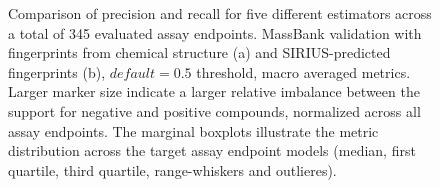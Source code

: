 \begin{figure}[h]
\begin{subfigure}[b]{0.495\textwidth}
      \caption{}
      \label{fig:hitcall_classification_Feature_Selection_XGBClassifier_mb_val_sirius_default_macro_avg}
  \end{subfigure}
  \caption{Comparison of precision and recall for five different estimators across a total of 345 evaluated assay endpoints. MassBank validation with fingerprints from chemical structure (a) and SIRIUS-predicted fingerprints (b), $default = 0.5$ threshold, macro averaged metrics. Larger marker size indicate a larger relative imbalance between the support for negative and positive compounds, normalized across all assay endpoints. The marginal boxplots illustrate the metric distribution across the target assay endpoint models (median, first quartile, third quartile, range-whiskers and outlieres).}
  \label{fig:hitcall_classification_Feature_Selection_XGBClassifier_mb_val_default_macro_avg}
\end{figure}



\newpage

